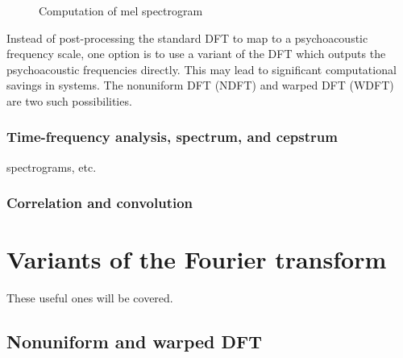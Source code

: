 \documentclass[letter,12pt,notitlepage]{article}
\begin{document}
\begin{figure}[ht]
	\centering
	\caption{Computation of mel spectrogram}
	\label{fig:melfilter}
\end{figure}

Instead of post-processing the standard DFT to map to a psychoacoustic frequency scale, one option is to use a variant of the DFT which outputs the psychoacoustic frequencies directly. This may lead to significant computational savings in systems. The nonuniform DFT (NDFT) and warped DFT (WDFT) are two such possibilities.


\subsubsection{Time-frequency analysis, spectrum, and cepstrum}

spectrograms, etc.

\subsubsection{Correlation and convolution}

\vfill
\clearpage

\section{Variants of the Fourier transform}
\label{sec:theoryvariant}

These useful ones will be covered.

\subsection{Nonuniform and warped DFT}
\end{document}
